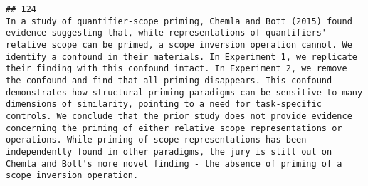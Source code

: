 \documentclass[
  english,
  man]{apa6}
\begin{document}
\begin{verbatim}
## 124                                                                                                                                                                                                                                                                                                                                                                                                                                                                                                                                                                                                                                                                                                                                                                                                                                                                                                                                                                                                                                                                                                                                                                                                                                                                                                                                                                                                                                                                                                                                                                                                                                                                                                                                            In a study of quantifier-scope priming, Chemla and Bott (2015) found evidence suggesting that, while representations of quantifiers' relative scope can be primed, a scope inversion operation cannot. We identify a confound in their materials. In Experiment 1, we replicate their finding with this confound intact. In Experiment 2, we remove the confound and find that all priming disappears. This confound demonstrates how structural priming paradigms can be sensitive to many dimensions of similarity, pointing to a need for task-specific controls. We conclude that the prior study does not provide evidence concerning the priming of either relative scope representations or operations. While priming of scope representations has been independently found in other paradigms, the jury is still out on Chemla and Bott's more novel finding - the absence of priming of a scope inversion operation.

\end{verbatim}
\end{document}
